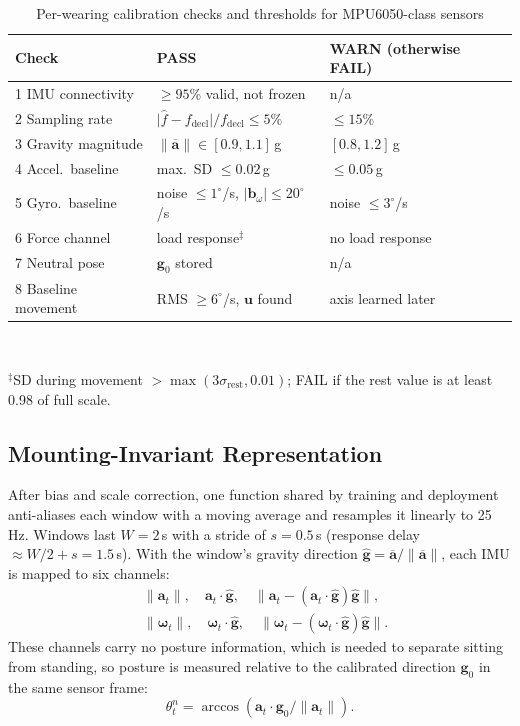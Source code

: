 \documentclass[conference]{IEEEtran}
\newcommand{\vect}[1]{\mathbf{#1}}
\begin{document}
\begin{table}[t]
\caption{Per-wearing calibration checks and thresholds for MPU6050-class sensors}
\label{tab:cal}
\centering
\scriptsize
\setlength{\tabcolsep}{2.5pt}
\begin{tabular}{@{}lll@{}}
\toprule
Check & PASS & WARN (otherwise FAIL) \\
\midrule
1 IMU connectivity & $\ge95$\% valid, not frozen & n/a \\
2 Sampling rate & $\lvert\hat f-f_{\mathrm{decl}}\rvert/f_{\mathrm{decl}}\le5$\% & $\le15$\% \\
3 Gravity magnitude & $\lVert\overline{\vect{a}}\rVert\in[0.9,1.1]$\,g & $[0.8,1.2]$\,g \\
4 Accel.\ baseline & max.\ SD $\le0.02$\,g & $\le0.05$\,g \\
5 Gyro.\ baseline & noise $\le1^\circ$/s, $\lvert\vect{b}_\omega\rvert\le20^\circ$/s & noise $\le3^\circ$/s \\
6 Force channel & load response$^\ddagger$ & no load response \\
7 Neutral pose & $\vect{g}_0$ stored & n/a \\
8 Baseline movement & RMS $\ge6^\circ$/s, $\vect{u}$ found & axis learned later \\
\bottomrule
\end{tabular}\\[2pt]
\parbox{\columnwidth}{\scriptsize $^\ddagger$SD during movement $>\max(3\sigma_{\mathrm{rest}},0.01)$; FAIL if the rest value is at least 0.98 of full scale.}
\end{table}

\subsection{Mounting-Invariant Representation}
After bias and scale correction, one function shared by training and deployment anti-aliases each window with a moving average and resamples it linearly to 25\,Hz. Windows last $W=2$\,s with a stride of $s=0.5$\,s (response delay $\approx W/2+s=1.5$\,s). With the window's gravity direction $\hat{\vect{g}}=\overline{\vect{a}}/\lVert\overline{\vect{a}}\rVert$, each IMU is mapped to six channels:
\begin{equation}
\begin{aligned}
&\lVert\vect{a}_t\rVert,\quad \vect{a}_t\!\cdot\!\hat{\vect{g}},\quad \lVert\vect{a}_t-(\vect{a}_t\!\cdot\!\hat{\vect{g}})\hat{\vect{g}}\rVert,\\
&\lVert\boldsymbol{\omega}_t\rVert,\quad \boldsymbol{\omega}_t\!\cdot\!\hat{\vect{g}},\quad \lVert\boldsymbol{\omega}_t-(\boldsymbol{\omega}_t\!\cdot\!\hat{\vect{g}})\hat{\vect{g}}\rVert .
\end{aligned}
\label{eq:inv}
\end{equation}
These channels carry no posture information, which is needed to separate sitting from standing, so posture is measured relative to the calibrated direction $\vect{g}_0$ in the same sensor frame:
\begin{equation}
\theta^{n}_t=\arccos\!\left(\vect{a}_t\!\cdot\!\vect{g}_0/\lVert\vect{a}_t\rVert\right).
\label{eq:neutral}
\end{equation}
\end{document}
